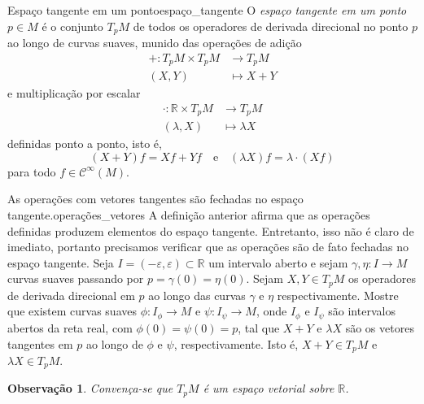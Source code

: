 \documentclass[12pt,a4paper]{article}
\numberwithin{equation}{section}
\newcommand\smooth[1]{\ensuremath{\mathcal{C}^\infty(#1)}}
\newtheorem{remark}{Observação}[section]
\begin{document}
\begin{definition}{Espaço tangente em um ponto}{espaço_tangente}
    O \emph{espaço tangente em um ponto \(p \in M\)} é o conjunto \(T_pM\) de todos os operadores de derivada direcional no ponto \(p\) ao longo de curvas suaves, munido das operações de adição
    \begin{align*}
        + : T_pM \times T_pM &\to T_pM\\
                       (X,Y) &\mapsto X + Y
    \end{align*}
    e multiplicação por escalar
    \begin{align*}
        \cdot : \mathbb{R} \times T_pM &\to T_pM\\
                           (\lambda,X) &\mapsto \lambda X
    \end{align*}
    definidas ponto a ponto, isto é,
    \begin{equation*}
        (X + Y)f = Xf + Yf\quad\text{e}\quad(\lambda X)f = \lambda\cdot(Xf)
    \end{equation*}
    para todo \(f \in \smooth{M}\).
\end{definition}

\begin{exercício}{As operações com vetores tangentes são fechadas no espaço tangente.}{operações_vetores}
    A definição anterior afirma que as operações definidas produzem elementos do espaço tangente. Entretanto, isso não é claro de imediato, portanto precisamos verificar que as operações são de fato fechadas no espaço tangente. Seja \(I = (-\varepsilon, \varepsilon) \subset \mathbb{R}\) um intervalo aberto e sejam \(\gamma, \eta : I \to M\) curvas suaves passando por \(p = \gamma(0) = \eta(0)\). Sejam \(X, Y \in T_pM\) os operadores de derivada direcional em \(p\) ao longo das curvas \(\gamma\) e \(\eta\) respectivamente. Mostre que existem curvas suaves \(\phi : I_\phi \to M\) e \(\psi : I_\psi \to M\), onde \(I_\phi\) e \(I_\psi\) são intervalos abertos da reta real, com \(\phi(0) = \psi(0) = p\), tal que \(X + Y\) e \(\lambda X\) são os vetores tangentes em \(p\) ao longo de \(\phi\) e \(\psi\), respectivamente. Isto é, \(X + Y \in T_pM\) e \(\lambda X \in T_pM\).
\end{exercício}
\begin{remark}
    Convença-se que \(T_pM\) é um espaço vetorial sobre \(\mathbb{R}\).
\end{remark}
\end{document}
